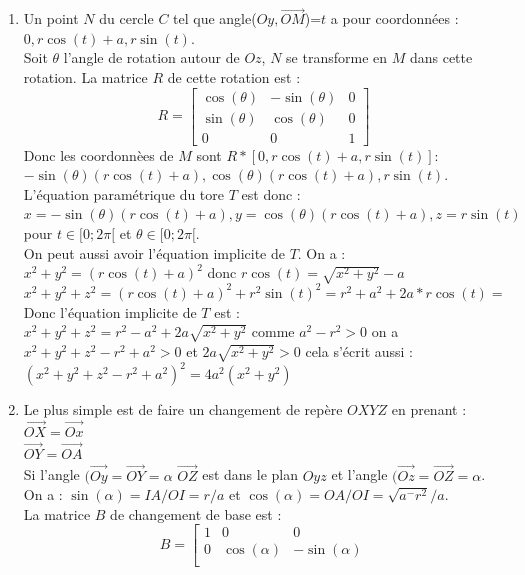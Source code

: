 \documentclass[a4paper,11pt]{book}
\begin{document}
\begin{enumerate}
\item Un point $N$ du cercle $C$ tel que angle($Oy,\overrightarrow{OM}$)=$t$ a 
pour coordonn\'ees : $0,r\cos(t)+a,r\sin(t)$.\\
Soit $\theta$ l'angle de rotation autour de $Oz$, $N$ se transforme en $M$ dans
 cette rotation. La matrice $R$ de cette rotation est :\\
$$
R=\left[
\begin{array}{ccc}
\cos(\theta) & -\sin(\theta) & 0\\
\sin(\theta) & \cos(\theta) & 0\\
0 & 0 & 1
\end{array}
\right]
$$
Donc les coordonn\`ees de $M$ sont $R*[0,r\cos(t)+a,r\sin(t)]$:\\
$-\sin(\theta)(r\cos(t)+a),\cos(\theta)(r\cos(t)+a),r\sin(t)$.\\
L'\'equation param\'etrique du tore $T$ est donc :\\
$x=-\sin(\theta)(r\cos(t)+a),y=\cos(\theta)(r\cos(t)+a),z=r\sin(t)$ pour 
$t\in [0;2\pi[$ et $\theta\in [0;2\pi[$.\\
On peut aussi avoir l'\'equation implicite de $T$. On a :\\
$x^2+y^2=(r\cos(t)+a)^2$ donc $r\cos(t)=\sqrt{x^2+y^2}-a$
$x^2+y^2+z^2=(r\cos(t)+a)^2+r^2\sin(t)^2=r^2+a^2+2a*r\cos(t)=$
Donc l'\'equation implicite de $T$ est  :\\
$x^2+y^2+z^2=r^2-a^2+2a\sqrt{x^2+y^2}$
comme $a^2-r^2>0$ on a $x^2+y^2+z^2-r^2+a^2>0$ et $2a\sqrt{x^2+y^2}>0$ cela 
s'\'ecrit aussi :
$(x^2+y^2+z^2-r^2+a^2)^2=4a^2(x^2+y^2)$
\item 
Le plus simple est de faire un changement de rep\`ere $OXYZ$ en prenant :\\
$\overrightarrow{OX}=\overrightarrow{Ox}$\\
$\overrightarrow{OY}=\overrightarrow{OA}$\\
Si l'angle $(\overrightarrow{Oy}=\overrightarrow{OY}=\alpha$
$\overrightarrow{OZ}$ est dans le plan $Oyz$ et 
l'angle $(\overrightarrow{Oz}=\overrightarrow{OZ}=\alpha$.\\
On a : $\sin(\alpha)=IA/OI=r/a$ et $\cos(\alpha)=OA/OI=\sqrt{a^-r^2}/a$.\\
La matrice $B$ de changement de base est :\\
$$
B=\left[
\begin{array}{ccc}
1&0&0\\
0&\cos(\alpha) & -\sin(\alpha)\\

\end{array}$$
\end{enumerate}
\end{document}
